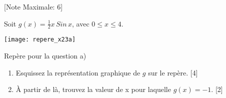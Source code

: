 \begin{question}
  \hspace*{\fill} [Note Maximale: 6]\par
  \medskip
  \noindent Soit $g(x) = \frac{1}{2}x\,Sin\,x$, avec $0 \le x \le 4$.\par
  \begin{center} %
    \texttt{[image: repere\_x23a]}\par
    \noindent Repère pour la question a)\par
  \end{center} %
  \begin{enumerate}[label=(\alph*)]
    \item Esquissez la représentation graphique de $g$ sur le repère.\hspace*{\fill} [4]
    \item À partir de là, trouvez la valeur de x pour laquelle $g(x) = -1$.\hspace*{\fill} [2]
  \end{enumerate}
\end{question}
